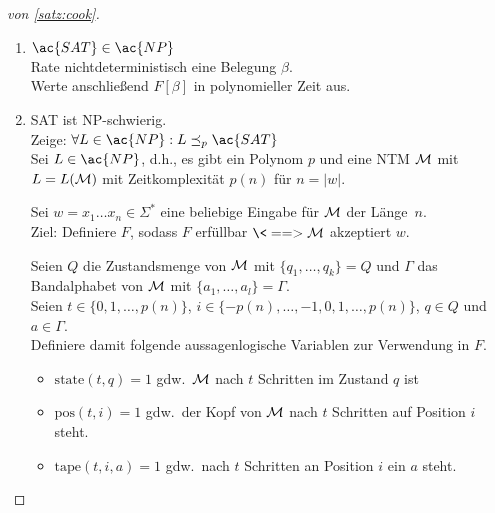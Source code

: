 \begin{proof}[von \autoref{satz:cook}]\
	\begin{enumerate}
	\item $\ac{SAT} \in \ac{NP}$\\
		Rate nichtdeterministisch eine Belegung $\beta$.\\
		Werte anschließend $F[\beta]$ in polynomieller Zeit aus.
	\item \ac{SAT} ist \ac{NP}-schwierig.\\
		Zeige: $\forall L\in \ac{NP}: L \preceq_p \ac{SAT}$\\
		Sei $L\in \ac{NP}$, d.h., es gibt ein Polynom $p$ und eine \ac{NTM} $\mathcal{M}$ mit $L=L(\mathcal{M})$ mit Zeitkomplexität $p(n)$ für $n = |w|$.
		
		Sei $w = x_1\dots x_n\in\Sigma^*$ eine beliebige Eingabe für $\mathcal{M}$ der Länge~$n$.\\
		Ziel: Definiere $F$, sodass $F$ erfüllbar $\<==> \M$ akzeptiert $w$.
		
		Seien $Q$ die Zustandsmenge von $\mathcal{M}$ mit $\{q_1,\dots,q_k\}=Q$ und $\Gamma$ das Bandalphabet von $\mathcal{M}$ mit $\{a_1,\dots,a_l\} = \Gamma$.\\
		Seien $t\in\{0,1,\dots,p(n)\}$, $i\in\{-p(n),\dots,-1,0,1,\dots,p(n)\}$, $q \in Q$ und $a\in\Gamma$. \\
		Definiere damit folgende aussagenlogische Variablen zur Verwendung in $F$.
		\begin{itemize}
		\item $\mathrm{state}(t,q) = 1$ gdw.\ $\mathcal{M}$ nach $t$ Schritten im Zustand $q$ ist
		\item $\mathrm{pos}(t,i) = 1$ gdw.\ der Kopf von $\mathcal{M}$ nach $t$ Schritten auf Position $i$ steht.
		\item $\mathrm{tape}(t,i,a) = 1$ gdw.\ nach $t$ Schritten an Position $i$ ein $a$ steht.
		\end{itemize}
	\end{enumerate}

	\medskip


\end{proof}
